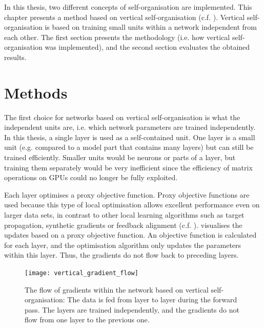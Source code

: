In this thesis, two different concepts of self-organisation are implemented.
This chapter presents a method based on vertical self-organisation (c.f. ).
Vertical self-organisation is based on training small units within a network independent from each other.
The first section presents the methodology (i.e. how vertical self-organisation was implemented), and the second section evaluates the obtained results.


\section{Methods}
The first choice for networks based on vertical self-organisation is what the independent units are, i.e. which network parameters are trained independently.
In this thesis, a single layer is used as a self-contained unit. One layer is a small unit (e.g. compared to a model part that contains many layers) but can still be trained efficiently.
Smaller units would be neurons or parts of a layer, but training them separately would be very inefficient since the efficiency of matrix operations on GPUs could no longer be fully exploited.

Each layer optimises a proxy objective function.
Proxy objective functions are used because this type of local optimisation allows excellent performance even on larger data sets, in contrast to other local learning algorithms such as target propagation, synthetic gradients or feedback alignment (c.f. ). 
  visualises the updates based on a proxy objective function.
An objective function is calculated for each layer, and the optimisation algorithm only updates the parameters within this layer.
Thus, the gradients do not flow back to preceding layers.

\begin{figure}[h]
    \centering
    \texttt{[image: vertical\_gradient\_flow]}
    \caption[The flow of gradients within the network based on vertical self-organisation]{The flow of gradients within the network based on vertical self-organisation: The data is fed from layer to layer during the forward pass. The layers are trained independently, and the gradients do not flow from one layer to the previous one.}
\end{figure}

